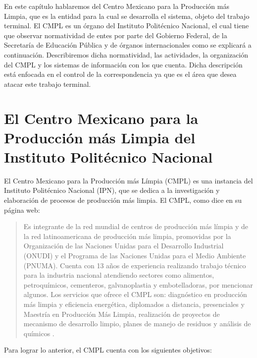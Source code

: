En este capítulo hablaremos del Centro Mexicano para la Producción más Limpia, que es la entidad para la cual se desarrolla el sistema, objeto del trabajo terminal. El CMPL es un órgano del Instituto Politécnico Nacional, el cual tiene que observar normatividad de entes por parte del Gobierno Federal, de la Secretaría de Educación Pública y de órganos internacionales como se explicará a continuación. Describiremos dicha normatividad, las actividades, la organización del CMPL y los sistemas de información con los que cuenta. Dicha descripción está enfocada en el control de la correspondencia ya que es el área que desea atacar este trabajo terminal.

\section{El Centro Mexicano para la Producción más Limpia del Instituto Politécnico Nacional}

	El Centro Mexicano para la Producción más Límpia (CMPL) es una instancia del Instituto Politécnico Nacional (IPN), que se dedica a la investigación y elaboración de procesos de producción más limpia. El CMPL, como dice en su página web:

	\begin{quotation}Es integrante de la red mundial de centros de producción más límpia y de la red latinoamericana de producción más limpia, promovidas por la Organización de las Naciones Unidas para el Desarrollo Industrial (ONUDI) y el Programa de las Naciones Unidas para el Medio Ambiente (PNUMA). Cuenta con 13 años de experiencia realizando trabajo técnico para la industria nacional atendiendo sectores como alimentos, petroquímicos, cementeros, galvanoplastia y embotelladoras, por mencionar algunos. Los servicios que ofrece el CMPL son: diagnóstico en producción más limpia y eficiencia energética, diplomados a distancia, presenciales y Maestría en Producción Más Limpia, realización de proyectos de mecanismo de desarrollo limpio, planes de manejo de residuos y análisis de químicos \cite{PoliticaCMPL}.
	\end{quotation}
	
	Para lograr lo anterior, el CMPL cuenta con los siguientes objetivos:
	
